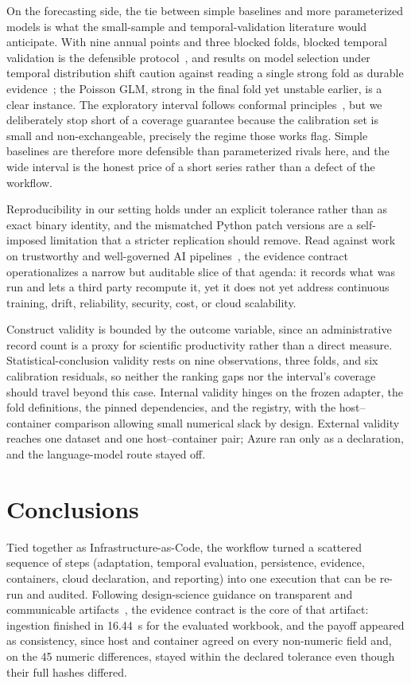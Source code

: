 \documentclass[runningheads]{llncs}
\begin{document}
        On the forecasting side, the tie between simple baselines and more parameterized models is what the small-sample and temporal-validation literature would anticipate. With nine annual points and three blocked folds, blocked temporal validation is the defensible protocol~\cite{ref15,ref16}, and results on model selection under temporal distribution shift caution against reading a single strong fold as durable evidence~\cite{ref17}; the Poisson GLM, strong in the final fold yet unstable earlier, is a clear instance. The exploratory interval follows conformal principles~\cite{ref18,ref19}, but we deliberately stop short of a coverage guarantee because the calibration set is small and non-exchangeable, precisely the regime those works flag. Simple baselines are therefore more defensible than parameterized rivals here, and the wide interval is the honest price of a short series rather than a defect of the workflow.

        Reproducibility in our setting holds under an explicit tolerance rather than as exact binary identity, and the mismatched Python patch versions are a self-imposed limitation that a stricter replication should remove. Read against work on trustworthy and well-governed AI pipelines~\cite{ref20,ref23,ref26}, the evidence contract operationalizes a narrow but auditable slice of that agenda: it records what was run and lets a third party recompute it, yet it does not yet address continuous training, drift, reliability, security, cost, or cloud scalability.

        Construct validity is bounded by the outcome variable, since an administrative record count is a proxy for scientific productivity rather than a direct measure. Statistical-conclusion validity rests on nine observations, three folds, and six calibration residuals, so neither the ranking gaps nor the interval's coverage should travel beyond this case. Internal validity hinges on the frozen adapter, the fold definitions, the pinned dependencies, and the registry, with the host--container comparison allowing small numerical slack by design. External validity reaches one dataset and one host--container pair; Azure ran only as a declaration, and the language-model route stayed off.
    \section{Conclusions}
        Tied together as Infrastructure-as-Code, the workflow turned a scattered sequence of steps (adaptation, temporal evaluation, persistence, evidence, containers, cloud declaration, and reporting) into one execution that can be re-run and audited. Following design-science guidance on transparent and communicable artifacts~\cite{ref9,ref10}, the evidence contract is the core of that artifact: ingestion finished in 16.44~s for the evaluated workbook, and the payoff appeared as consistency, since host and container agreed on every non-numeric field and, on the 45 numeric differences, stayed within the declared tolerance even though their full hashes differed.
\end{document}
